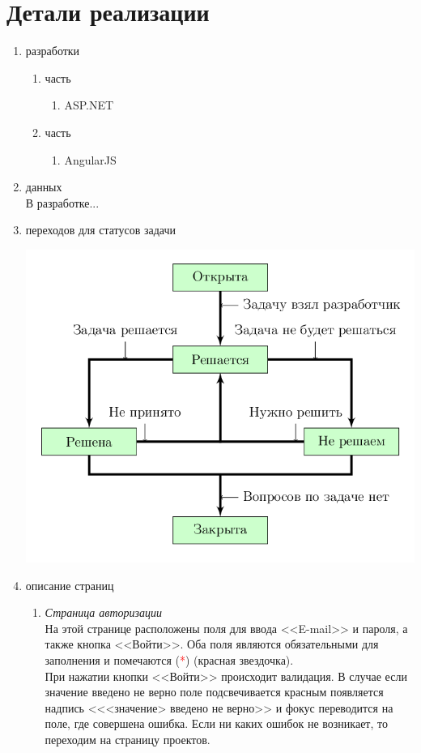 \documentclass[14pt,a4paper]{extarticle}
\begin{document}
	\section {Детали реализации}
	\begin{enumerate}
		\item{ разработки}
		\begin{enumerate}
			\item { часть}
			\begin{enumerate}
				\item ASP.NET
			\end{enumerate}
			
			\item { часть}
			\begin{enumerate}
				\item AngularJS
			\end{enumerate}
		\end{enumerate}
		
		\item{ данных}\\
			В разработке...
			
		\item{ переходов для статусов задачи}
			\begin{center}
				\includegraphics[scale=0.5]{res/TransitionScheme/TransitionScheme.png} 
			\end{center}
			
		\item{ описание страниц}
			\begin{enumerate}
				\item{\it Страница авторизации}\\
				На этой странице расположены поля для ввода <<E-mail>> и пароля, а также кнопка <<Войти>>. Оба поля являются обязательными для заполнения и помечаются (\textcolor{red}{*}) (красная звездочка).\\
				При нажатии кнопки <<Войти>> происходит валидация. В случае если значение введено не верно поле подсвечивается красным появляется надпись <<<значение> введено не верно>> и фокус переводится на поле, где совершена ошибка. Если ни каких ошибок не возникает, то переходим на страницу проектов.
				

\end{enumerate}
\end{enumerate}
\end{document}
